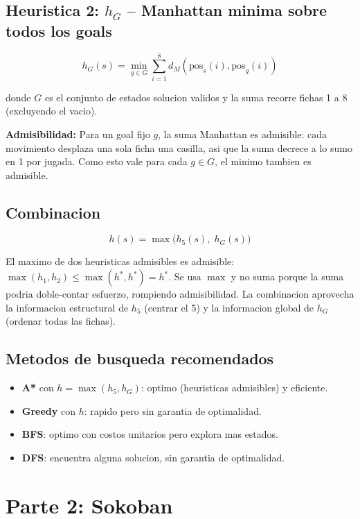 \documentclass[12pt, a4paper]{article}
\begin{document}
\subsection{Heuristica 2: $h_G$ -- Manhattan minima sobre todos los goals}

$$h_G(s) = \min_{g \in G} \sum_{i=1}^{8} d_M(\text{pos}_s(i), \text{pos}_g(i))$$

donde $G$ es el conjunto de estados solucion validos y la suma recorre fichas 1 a 8 (excluyendo el vacio).

\textbf{Admisibilidad:} Para un goal fijo $g$, la suma Manhattan es admisible: cada movimiento desplaza una sola ficha una casilla, asi que la suma decrece a lo sumo en 1 por jugada. Como esto vale para cada $g \in G$, el minimo tambien es admisible.

\subsection{Combinacion}

$$h(s) = \max\big(h_5(s),\; h_G(s)\big)$$

El maximo de dos heuristicas admisibles es admisible: $\max(h_1, h_2) \leq \max(h^*, h^*) = h^*$. Se usa $\max$ y no suma porque la suma podria doble-contar esfuerzo, rompiendo admisibilidad. La combinacion aprovecha la informacion estructural de $h_5$ (centrar el 5) y la informacion global de $h_G$ (ordenar todas las fichas).

\subsection{Metodos de busqueda recomendados}

\begin{itemize}
  \item \textbf{A*} con $h = \max(h_5, h_G)$: optimo (heuristicas admisibles) y eficiente.
  \item \textbf{Greedy} con $h$: rapido pero sin garantia de optimalidad.
  \item \textbf{BFS}: optimo con costos unitarios pero explora mas estados.
  \item \textbf{DFS}: encuentra alguna solucion, sin garantia de optimalidad.
\end{itemize}

\section{Parte 2: Sokoban}
\end{document}
